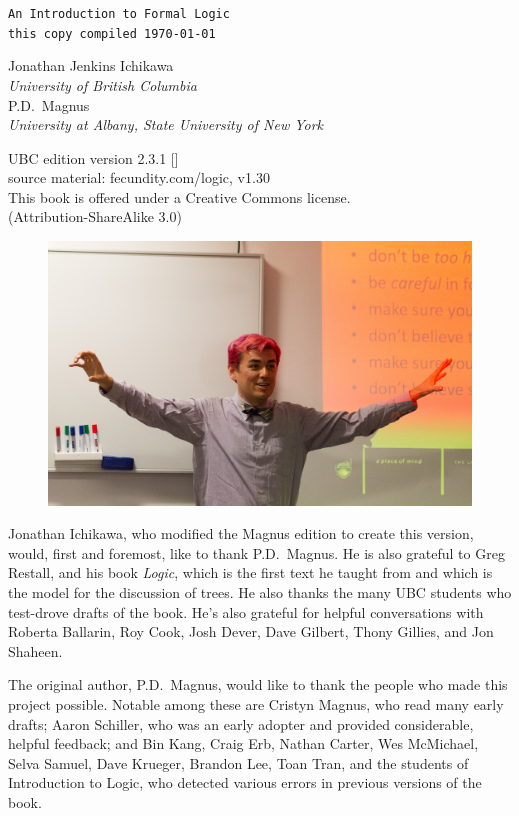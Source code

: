 \thispagestyle{empty}
{\Huge\forallx}

{\tt An Introduction to Formal Logic\\
this copy compiled \today}
\vfill



{\sf Jonathan Jenkins Ichikawa}\\
\emph{University of British Columbia}
\\
{\sf P.D.\ Magnus}\\
\emph{University at Albany, State University of New York}\\




\vfill




{\sf
	UBC edition version 2.3.1 [\bookversion]\\
	source material: fecundity.com/logic, v1.30\\
	This book is offered under a Creative Commons license.\\
	(Attribution-ShareAlike 3.0)
}



\newpage
\thispagestyle{empty}%

\begin{figure}[h!]
  \includegraphics[width=\linewidth]{images/ichikawa.jpg}
  \centering
\end{figure}

{\sf
Jonathan Ichikawa, who modified the Magnus edition to create this version, would, first and foremost, like to thank P.D.\ Magnus. He is also grateful to Greg Restall, and his book \emph{Logic}, which is the first text he taught from and which is the model for the discussion of trees. He also thanks the many UBC students who test-drove drafts of the book. He's also grateful for helpful conversations with Roberta Ballarin, Roy Cook, Josh Dever, Dave Gilbert, Thony Gillies, and Jon Shaheen.

The original author, P.D.\ Magnus, would like to thank the people who made this project possible. Notable among these are Cristyn Magnus, who read many early drafts; Aaron Schiller, who was an early adopter and provided considerable, helpful feedback; {and} Bin Kang, Craig Erb, Nathan Carter, Wes McMichael, Selva Samuel, Dave Krueger, Brandon Lee, Toan Tran, and the students of Introduction to Logic, who detected various errors in previous versions of the book.
}

